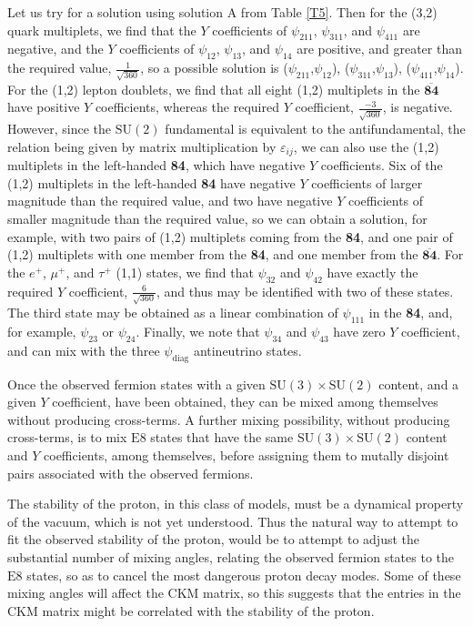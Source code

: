 \documentclass[a4paper,12pt,oneside]{article}
\begin{document}
Let us try for a solution using solution A from Table \ref{T5}.  
Then for the (3,2) quark multiplets, we find that the $Y$ 
coefficients of $\psi_{211}$, $\psi_{311}$, and $\psi_{411}$ are
negative, and the $Y$ coefficients of $\psi_{12}$, $\psi_{13}$, and
$\psi_{14}$ are positive, and greater than the required value,
$\frac{1}{\sqrt{360}}$, so a possible solution is 
($\psi_{211}$,$\psi_{12}$), ($\psi_{311}$,$\psi_{13}$), 
($\psi_{411}$,$\psi_{14}$).
For the (1,2) lepton doublets, we find that all eight (1,2)
multiplets in the $\mathbf{\overline{84}}$ have positive $Y$
coefficients, whereas the required $Y$ coefficient,
$\frac{-3}{\sqrt{360}}$, is negative.  However, since the 
$\mathrm{SU}(2)$ fundamental is equivalent to the antifundamental,
the relation being given by matrix multiplication by 
$\varepsilon_{ij}$, we can also use the (1,2) multiplets in the
left-handed \textbf{84}, which have negative $Y$ coefficients.  Six
of the (1,2) multiplets in the left-handed \textbf{84} have 
negative $Y$ coefficients of larger magnitude than the required
value, and two have negative $Y$ coefficients of smaller magnitude
than the required value, so we can obtain a solution, for example,
with two pairs of (1,2) multiplets coming from the \textbf{84}, and
one pair of (1,2) multiplets with one member from the \textbf{84},
and one member from the $\mathbf{\overline{84}}$.  For the $e^+$,
$\mu^+$, and $\tau^+$ (1,1) states, we find that $\psi_{32}$ and
$\psi_{42}$ have exactly the required $Y$ coefficient, 
$\frac{6}{\sqrt{360}}$, and thus may be identified with two of these
states.  The third state may be obtained as a linear combination of
$\psi_{111}$ in the \textbf{84}, and, for example, $\psi_{23}$ or
$\psi_{24}$.  Finally, we note that $\psi_{34}$ and $\psi_{43}$ have
zero $Y$ coefficient, and can mix with the three 
$\psi_{\mathrm{diag}}$ antineutrino states.

Once the observed fermion states with a given $\mathrm{SU}(3)\times
\mathrm{SU}(2)$ content, and a given $Y$ coefficient, have been
obtained, they can be mixed among themselves without producing
cross-terms.  A further mixing possibility, without producing
cross-terms, is to mix $\mathrm{E}8$ states that have the same
$\mathrm{SU}(3)\times\mathrm{SU}(2)$ content and $Y$ coefficients,
among themselves, before assigning them to mutally disjoint pairs
associated with the observed fermions.

The stability of the proton, in this class of models, must be a
dynamical property of the vacuum, which is not yet understood.  Thus
the natural way to attempt to fit the observed stability of the
proton, would be to attempt to adjust the substantial number of
mixing angles, relating the observed fermion states to the 
$\mathrm{E}8$ states, so as to cancel the most dangerous proton
decay modes.  Some of these mixing angles will affect the CKM 
matrix, so this suggests that the entries in the CKM matrix might be
correlated with the stability of the proton.
\end{document}
